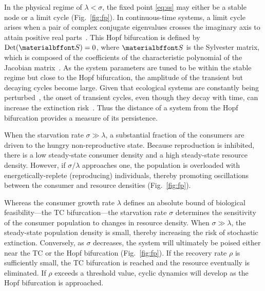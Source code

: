 \documentclass{pnastwo}
\begin{document}
\begin{article}
In the physical regime of $\lambda<\sigma$, the fixed point \eqref{eq:ss} may
either be a stable node or a limit cycle (Fig.~\ref{fig:fp}).  In
continuous-time systems, a limit cycle arises when a pair of complex
conjugate eigenvalues crosses the imaginary axis to attain positive real
parts~\cite{GuckHolmes}.  This Hopf bifurcation is defined by
${\rm Det}({\bf S}) = 0$, where $\bf S$ is the Sylvester matrix, which is
composed of the coefficients of the characteristic polynomial of the Jacobian
matrix~\cite{Gross:2004p2428}.  As the system parameters are tuned to be
within the stable regime but close to the Hopf bifurcation, the amplitude of
the transient but decaying cycles become large.  Given that ecological
systems are constantly being perturbed~\cite{Hastings:2001jh}, the onset of
transient cycles, even though they decay with time, can increase the
extinction risk~\cite{Neubert:1997wk,Caswell:2005eo,Neubert:2009td}.  Thus
the distance of a system from the Hopf bifurcation provides a measure of its
persistence.

When the starvation rate $\sigma\gg\lambda$, a substantial fraction of the
consumers are driven to the hungry non-reproductive state.  Because
reproduction is inhibited, there is a low steady-state consumer density and a
high steady-state resource density.  However, if $\sigma/\lambda$ approaches
one, the population is overloaded with energetically-replete (reproducing)
individuals, thereby promoting oscillations between the consumer and resource
densities (Fig.~\ref{fig:fp}).

Whereas the consumer growth rate $\lambda$ defines an absolute bound of
biological feasibility---the TC bifurcation---the starvation rate $\sigma$
determines the sensitivity of the consumer population to changes in resource
density.  When $\sigma\gg\lambda$, the steady-state population density is
small, thereby increasing the risk of stochastic extinction.  Conversely, as
$\sigma$ decreases, the system will ultimately be poised either near the TC
or the Hopf bifurcation (Fig.~\ref{fig:fp}).  If the recovery rate $\rho$ is
sufficiently small, the TC bifurcation is reached and the resource eventually
is eliminated.  If $\rho$ exceeds a threshold value, cyclic dynamics will
develop as the Hopf bifurcation is approached.


\end{article}
\end{document}
